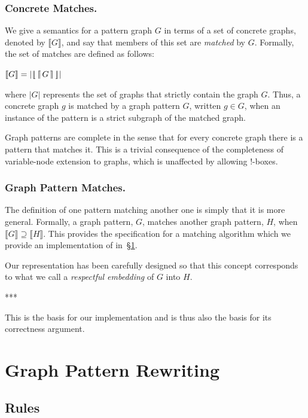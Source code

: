 \documentclass[runningheads]{llncs}
\newcommand{\vinterp}[1]{\lfloor\hspace{-0.27em}|\, #1\, |\hspace{-0.27em}\rfloor}
\newcommand{\binterp}[1]{\lceil\hspace{-0.27em}|\, #1\, |\hspace{-0.27em}\rceil}
\newcommand{\minterp}[1]{\llbracket #1 \rrbracket}
\newcommand{\sinterp}[1]{| #1 |}
\begin{document}
\subsubsection{Concrete Matches.}

We give a semantics for a pattern graph $G$ in terms of a set of
concrete graphs, denoted by $\minterp{G}$, and say that members of
this set are \emph{matched} by $G$. Formally, the set of matches are
defined as follows:

$\minterp{G} = \sinterp{\vinterp{\binterp{G}}}$

\noindent where $\sinterp{G}$ represents the set of graphs that
strictly contain the graph $G$. Thus, a concrete graph $g$ is matched
by a graph pattern $G$, written $g \in G$, when an instance of the
pattern is a strict subgraph of the matched graph. 

Graph patterns are complete in the sense that for every concrete graph
there is a pattern that matches it. This is a trivial consequence of
the completeness of variable-node extension to graphs, which is
unaffected by allowing !-boxes.

\subsubsection{Graph Pattern Matches.}

The definition of one pattern matching another one is simply that it
is more general. Formally, a graph pattern, $G$, matches another graph
pattern, $H$, when $\minterp{G} \supseteq \minterp{H}$. This provides
the specification for a matching algorithm which we provide an
implementation of in~\S\ref{sec:rewriting}.

Our representation has been carefully designed so that this concept
corresponds to what we call a \emph{respectful embedding} of $G$ into
$H$. 

*** 

This is the basis for our implementation and is thus also the basis
for its correctness argument. 




\section{Graph Pattern Rewriting}
\label{sec:rewriting}

\subsection{Rules}
\end{document}
